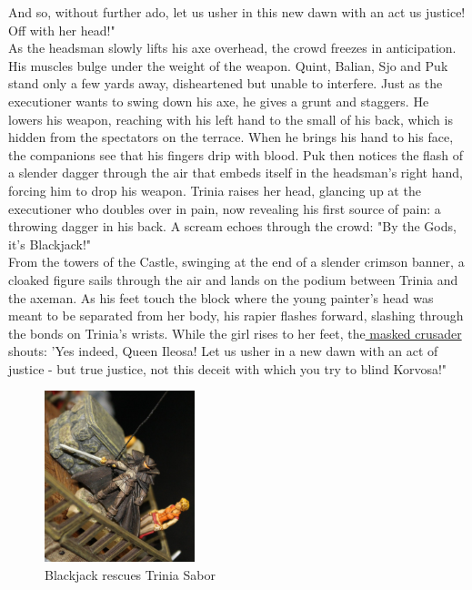And so, without further ado, let us usher in this new dawn with an act us justice! Off with her head!"\\

As the headsman slowly lifts his axe overhead, the crowd freezes in anticipation. His muscles bulge under the weight of the weapon. Quint, Balian, Sjo and Puk stand only a few yards away, disheartened but unable to interfere. Just as the executioner wants to swing down his axe, he gives a grunt and staggers. He lowers his weapon, reaching with his left hand to the small of his back, which is hidden from the spectators on the terrace. When he brings his hand to his face, the companions see that his fingers drip with blood. Puk then notices the flash of a slender dagger through the air that embeds itself in the headsman's right hand, forcing him to drop his weapon. Trinia raises her head, glancing up at the executioner who doubles over in pain, now revealing his first source of pain: a throwing dagger in his back. A scream echoes through the crowd: "By the Gods, it's Blackjack!"\\

From the towers of the Castle, swinging at the end of a slender crimson banner, a cloaked figure sails through the air and lands on the podium between Trinia and the axeman. As his feet touch the block where the young painter's head was meant to be separated from her body, his rapier flashes forward, slashing through the bonds on Trinia's wrists. While the girl rises to her feet, the\hyperref[fig:Blackjack-rescues-Trinia-Sabor-472558046]{ masked crusader } shouts: 'Yes indeed, Queen Ileosa! Let us usher in a new dawn with an act of justice - but true justice, not this deceit with which you try to blind Korvosa!" \\

\begin{figure}[h]
	\centering
	\includegraphics[width=0.39\textwidth]{images/Blackjack-rescues-Trinia-Sabor-472558046.jpg}
	\caption{Blackjack rescues Trinia Sabor}
	\label{fig:Blackjack-rescues-Trinia-Sabor-472558046}
\end{figure}

